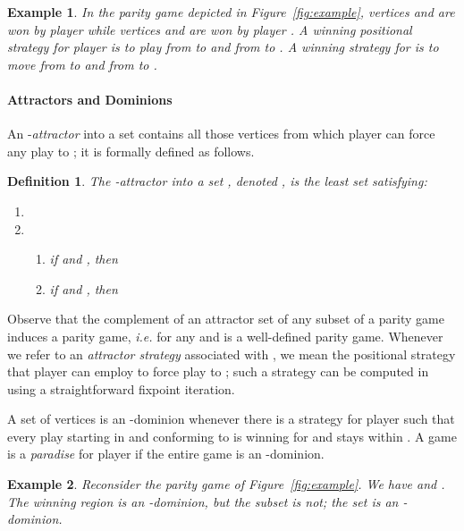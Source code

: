 \documentclass{eptcs}
\newtheorem{defi}{Definition}
\newtheorem{exam}{Example}
\newenvironment{definition}{\begin{defi} \rm }{\end{defi}}
\newenvironment{example}{\begin{exam} \rm }{\end{exam}}
\newcommand{\odd}{\ensuremath{\square}\xspace}
\newcommand{\ie}{\emph{i.e.}\xspace}
\begin{document}
\begin{example}
In the parity game depicted in Figure~\ref{fig:example}, vertices
 and  are won by player  while vertices  and  are
won by player . A winning positional strategy for player 
is to play from  to  and from  to . A winning
strategy for  is to move from  to  and
from  to .
\end{example}

\paragraph*{Attractors and Dominions}
An -\emph{attractor} into a
set  contains all those vertices from which player  can
force any play to ; it is formally defined as follows.
\begin{definition} The -\emph{attractor} into a set ,
denoted , is the least set  satisfying:
\begin{enumerate}
 \item 
 \item
 \begin{enumerate}
 \item if  and , then 
 \item if  and , then 
 \end{enumerate}
\end{enumerate}

\end{definition}
Observe that the complement of an attractor set of any subset of a
parity game induces a parity game, \ie 
for any  and  is a well-defined parity game.  Whenever we
refer to an \emph{attractor strategy} associated with ,
we mean the positional strategy that player  can employ to force
play to ; such a strategy can be computed in 
using a straightforward fixpoint iteration.

A set of vertices  is an -dominion whenever there is a
strategy  for player  such that every play starting in
 and conforming to  is winning for  and stays within
. A game is a \emph{paradise} for player  if the entire game
is an -dominion.

\begin{example}
Reconsider the parity game of Figure~\ref{fig:example}. We have
 and .
The winning region  is an -dominion, but the
subset  is not; the set  is an -dominion.
\end{example}


\newcommand{\Nat}{\ensuremath{\mathbb{N}}}
\newcommand{\prog}[3]{\ensuremath{\textsf{Prog}(#1,#2,#3)}}
\newcommand{\lift}[2]{\ensuremath{\textsf{Lift}(#1,#2)}}
\newcommand{\liftodd}[2]{\ensuremath{\textsf{Lift}_\odd(#1,#2)}}
\def\progname{\textsf{Prog}}
\def\liftname{\textsf{Lift}}
\end{document}
